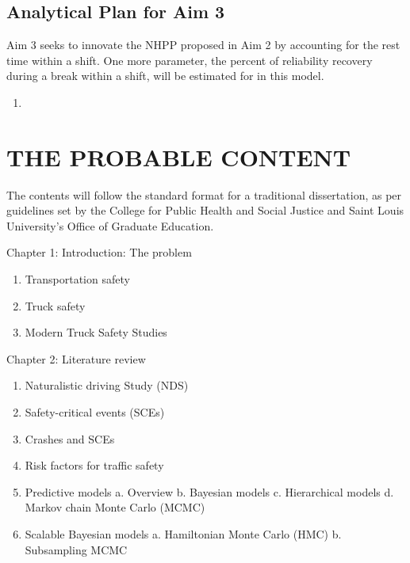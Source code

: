 \documentclass[12pt]{book}
\numberwithin{equation}{chapter}
\providecommand{\tightlist}{%
  \setlength{\itemsep}{0pt}\setlength{\parskip}{0pt}}
\begin{document}
\hypertarget{analytical-plan-for-aim-3}{%
\section{Analytical Plan for Aim 3}\label{analytical-plan-for-aim-3}}

Aim 3 seeks to innovate the NHPP proposed in Aim 2 by accounting for the rest time within a shift. One more parameter, the percent of reliability recovery during a break within a shift, will be estimated for in this model.

\begin{enumerate}
\def\labelenumi{\arabic{enumi}.}
\item
\end{enumerate}

\hypertarget{the-probable-content}{%
\chapter{THE PROBABLE CONTENT}\label{the-probable-content}}

The contents will follow the standard format for a traditional dissertation, as per guidelines set by the College for Public Health and Social Justice and Saint Louis University's Office of Graduate Education.

Chapter 1: Introduction: The problem

\begin{enumerate}
\def\labelenumi{\arabic{enumi}.}
\tightlist
\item
  Transportation safety
\item
  Truck safety
\item
  Modern Truck Safety Studies
\end{enumerate}

Chapter 2: Literature review

\begin{enumerate}
\def\labelenumi{\arabic{enumi}.}
\tightlist
\item
  Naturalistic driving Study (NDS)
\item
  Safety-critical events (SCEs)
\item
  Crashes and SCEs
\item
  Risk factors for traffic safety
\item
  Predictive models
  a. Overview
  b. Bayesian models
  c. Hierarchical models
  d. Markov chain Monte Carlo (MCMC)
\item
  Scalable Bayesian models
  a. Hamiltonian Monte Carlo (HMC)
  b. Subsampling MCMC
\end{enumerate}
\end{document}

